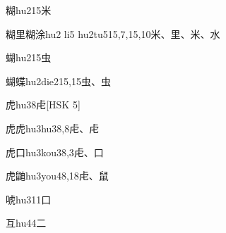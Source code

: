 \begin{EntryWithPhonetic}{糊}{hu2}{15}{⽶}
\end{EntryWithPhonetic}

\begin{EntryWithPhonetic}{糊里糊涂}{hu2 li5 hu2tu5}{15,7,15,10}{⽶、⾥、⽶、⽔}
\end{EntryWithPhonetic}

\begin{EntryWithPhonetic}{蝴}{hu2}{15}{⾍}
\end{EntryWithPhonetic}

\begin{EntryWithPhonetic}{蝴蝶}{hu2die2}{15,15}{⾍、⾍}
\end{EntryWithPhonetic}

\begin{EntryWithPhonetic}{虎}{hu3}{8}{⾌}[HSK 5]
\end{EntryWithPhonetic}

\begin{EntryWithPhonetic}{虎虎}{hu3hu3}{8,8}{⾌、⾌}
\end{EntryWithPhonetic}

\begin{EntryWithPhonetic}{虎口}{hu3kou3}{8,3}{⾌、⼝}
\end{EntryWithPhonetic}

\begin{EntryWithPhonetic}{虎鼬}{hu3you4}{8,18}{⾌、⿏}
\end{EntryWithPhonetic}

\begin{EntryWithPhonetic}{唬}{hu3}{11}{⼝}
\end{EntryWithPhonetic}

\begin{EntryWithPhonetic}{互}{hu4}{4}{⼆}
\end{EntryWithPhonetic}


